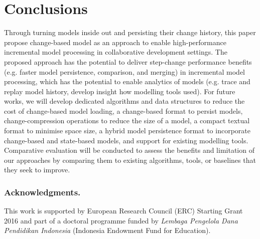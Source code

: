 \documentclass{llncs}
\begin{document}
\section{Conclusions}
\label{Conclusions}
Through turning models inside out and persisting their change history, this paper propose change-based model as an approach to enable high-performance incremental model processing in collaborative development settings. The proposed approach has the potential to deliver step-change performance benefits (e.g. faster model persistence, comparison, and merging) in incremental model processing, which has the potential to enable analytics of models (e.g. trace and replay model history, develop insight how modelling tools used). For future works, we will develop dedicated algorithms and data structures to reduce the cost of change-based model loading, a change-based format to persist models, change-compression operations to reduce the size of a model, a compact textual format to minimise space size, a hybrid model persistence format to incorporate change-based and state-based models, and support for existing modelling tools. Comparative evaluation will be conducted to assess the benefits and limitation of our approaches by comparing them to existing algorithms, tools, or baselines that they seek to improve.

\subsubsection*{Acknowledgments.} This work is supported by European Research Council (ERC) Starting Grant 2016 and part of a doctoral programme funded by \emph{Lembaga Pengelola Dana Pendidikan Indonesia} (Indonesia Endowment Fund for Education).

 

\end{document}
